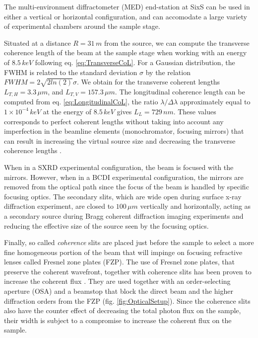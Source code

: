 The multi-environment diffractometer (MED) end-station at SixS can be used in either a vertical or horizontal configuration, and can accomodate a large variety of experimental chambers around the sample stage.

Situated at a distance $R = 31 \, m$ from the source, we can compute the transverse coherence length of the beam at the sample stage when working with an energy of $8.5 \, keV$ following eq. \ref{eq:TransverseCoL}.
For a Gaussian distribution, the FWHM is related to the standard deviation $\sigma$ by the relation $FWHM = 2\sqrt{2 ln (2) } \sigma$.
We obtain for the transverse coherent lengths $L_{T,H} = 3.3 \, \mu m$, and $L_{T,V} = 157.3 \, \mu m$.
The longitudinal coherence length can be computed from eq. \ref{eq:LongitudinalCoL}, the ratio $\lambda/\Delta\lambda$ approximately equal to $1\times10^{-4} \, keV$ at the energy of $8.5 \, keV$ gives $L_L = 729 \, nm$.
These values corresponds to perfect coherent lengths without taking into account any imperfection in the beamline elements (monochromator, focusing mirrors) that can result in increasing the virtual source size and decreasing the transverse coherence lengths \parencite{vincentjacques2010}.

When in a SXRD experimental configuration, the beam is focused with the mirrors.
However, when in a BCDI experimental configuration, the mirrors are removed from the optical path since the focus of the beam is handled by specific focusing optics.
The secondary slits, which are wide open during surface x-ray diffraction experiment, are closed to $100 \, \mu m$ vertically and horizontally, acting as a secondary source during Bragg coherent diffraction imaging experiments and reducing the effective size of the source seen by the focusing optics.

Finally, so called \textit{coherence} slits are placed just before the sample to select a more fine homogeneous portion of the beam that will impinge on focusing refractive lenses called Fresnel zone plates (FZP).
The use of Fresnel zone plates, that preserve the coherent wavefront, together with coherence slits has been proven to increase the coherent flux \parencite{Schroer2008, diaz_coherent_2009, Mastropietro2011}.
They are used together with an order-selecting aperture (OSA) and a beamstop that block the direct beam and the higher diffraction orders from the FZP (fig. \ref{fig:OpticalSetup}).
Since the coherence slits also have the counter effect of decreasing the total photon flux on the sample, their width is subject to a compromise to increase the coherent flux on the sample.

